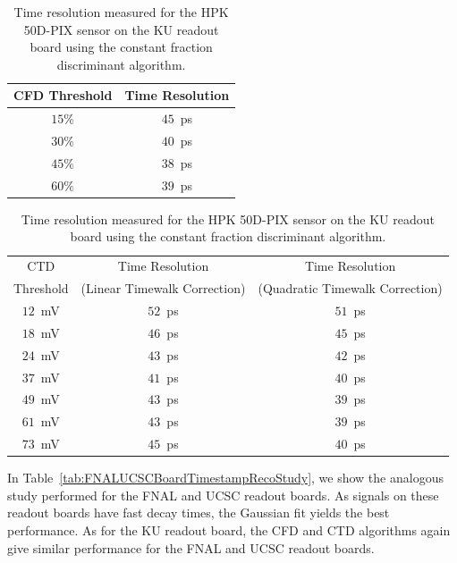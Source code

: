 \documentclass[preprint,1p]{elsarticle}
\begin{document}
\begin{table}[!htb]
\scriptsize
\begin{center}
  \begin{tabular}{ |c | c | }
    \hline
    CFD Threshold & Time Resolution \\ \hline
    $15\%$ & $45$~ps \\       
    $30\%$ & $40$~ps \\       
    $45\%$ & $38$~ps \\       
    $60\%$ & $39$~ps \\       
    \hline
  \end{tabular}
\caption{Time resolution measured for the HPK 50D-PIX sensor on the KU readout board using
the constant fraction discriminant algorithm.}  
\label{tab:KUBoardCFD}
\end{center}
\end{table}

\begin{table}[!htb]
\scriptsize
\begin{center}
  \begin{tabular}{ |c | c | c | }
    \hline
    CTD         & Time Resolution & Time Resolution   \\ 
    Threshold   & (Linear Timewalk Correction) & (Quadratic Timewalk Correction)  \\ \hline 
    $12$~mV & $52$~ps & $51$~ps \\       
    $18$~mV & $46$~ps & $45$~ps \\       
    $24$~mV & $43$~ps & $42$~ps \\       
    $37$~mV & $41$~ps & $40$~ps \\       
    $49$~mV & $43$~ps & $39$~ps \\       
    $61$~mV & $43$~ps & $39$~ps \\       
    $73$~mV & $45$~ps & $40$~ps \\       
    \hline
  \end{tabular}
\caption{Time resolution measured for the HPK 50D-PIX sensor on the KU readout board using
the constant fraction discriminant algorithm.}  
\label{tab:KUBoardCTD}
\end{center}
\end{table}

In Table~\ref{tab:FNALUCSCBoardTimestampRecoStudy}, we show the analogous study performed
for the FNAL and UCSC readout boards. As signals on these readout boards have fast decay
times, the Gaussian fit yields the best performance. As for the KU readout board, 
the CFD and CTD algorithms again give similar performance 
for the FNAL and UCSC readout boards.
\end{document}
